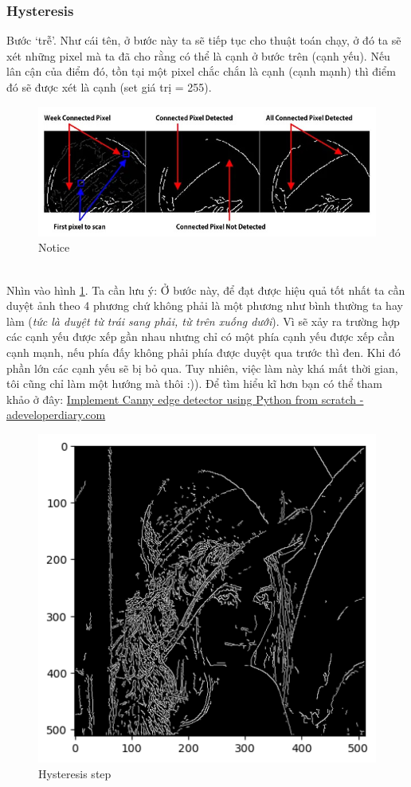 \documentclass{article}
\begin{document}
    \subsubsection{Hysteresis}
    Bước `trễ'. Như cái tên, ở bước này ta sẽ tiếp tục cho thuật toán chạy, ở đó ta sẽ xét những pixel mà ta đã cho rằng có thể là cạnh ở bước trên (cạnh yếu). Nếu lân cận của điểm đó, tồn tại một pixel chắc chắn là cạnh (cạnh mạnh) thì điểm đó sẽ được xét là cạnh (set giá trị = 255).
    \begin{figure}[ht!]
        \centering
        \includegraphics[width = 0.7\linewidth]{fig13.jpg}
        \caption{Notice}
        \label{fig14}
    \end{figure}
    \phantom{a}\\
    Nhìn vào hình \ref{fig14}. Ta cần lưu ý: Ở bước này, để đạt được hiệu quả tốt nhất ta cần duyệt ảnh theo 4 phương chứ không phải là một phương như bình thường ta hay làm (\textit{tức là duyệt từ trái sang phải, từ trên xuống dưới}). Vì sẽ xảy ra trường hợp các cạnh yếu được xếp gần nhau nhưng chỉ có một phía cạnh yếu được xếp cần cạnh mạnh, nếu phía đấy không phải phía được duyệt qua trước thì đen. Khi đó phần lớn các cạnh yếu sẽ bị bỏ qua. Tuy nhiên, việc làm này khá mất thời gian, tôi cũng chỉ làm một hướng mà thôi :)). Để tìm hiểu kĩ hơn bạn có thể tham khảo ở đây:
    \href{https://www.adeveloperdiary.com/data-science/computer-vision/implement-canny-edge-detector-using-python-from-scratch/}{Implement Canny edge detector using Python from scratch - adeveloperdiary.com}
    \begin{figure}[ht!]
        \centering
        \includegraphics[width = 0.5\linewidth]{fig14.png}
        \caption{Hysteresis step}
        \label{fig15}
    \end{figure}
\end{document}
